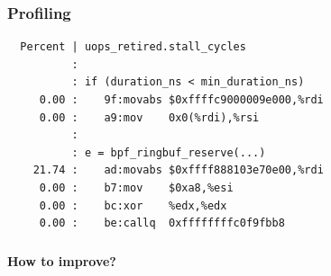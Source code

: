 \documentclass[usenames,dvipsnames, 18pt, compress, aspectratio=169]{beamer}
\begin{document}
\begin{frame}[fragile]{}
    \frametitle{Profiling}

    \begin{center}
        \begin{verbatim}
  Percent | uops_retired.stall_cycles
          :
          : if (duration_ns < min_duration_ns)
     0.00 :    9f:movabs $0xffffc9000009e000,%rdi
     0.00 :    a9:mov    0x0(%rdi),%rsi
          :
          : e = bpf_ringbuf_reserve(...)
    21.74 :    ad:movabs $0xffff888103e70e00,%rdi
     0.00 :    b7:mov    $0xa8,%esi
     0.00 :    bc:xor    %edx,%edx
     0.00 :    be:callq  0xffffffffc0f9fbb8
        \end{verbatim}
    \end{center}
\end{frame}

\fontsize{26pt}{26}\selectfont
\begin{frame}[fragile]{}
    \frametitle{}

    \begin{center}
        \textbf{How to improve?}
    \end{center}
\end{frame}

\fontsize{17pt}{18}\selectfont
\end{document}
